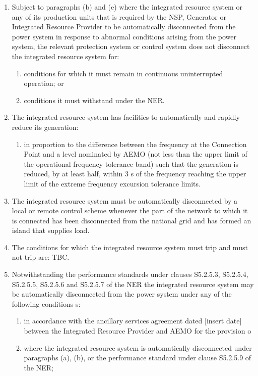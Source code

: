 \begin{enumerate}[label=(\alph*)]
	\item Subject to paragraphs (b) and (e) where the integrated resource system or any of its production units that is required by the NSP, Generator or Integrated Resource Provider to be automatically disconnected from the power system in response to abnormal conditions arising from the power system, the relevant protection system or control system does not disconnect the integrated resource system  for:
	\begin{enumerate}[label=(\roman*)]
		\item conditions for which it must remain in continuous uninterrupted operation; or
		\item conditions it must withstand under the NER.
	\end{enumerate}
	\item The integrated resource system has facilities to automatically and rapidly reduce its generation:
	\begin{enumerate}[label=(\roman*)]
		\item in proportion to the difference between the frequency at the Connection Point and a level nominated by AEMO (not less than the upper limit of the operational frequency tolerance band) such that the generation is reduced, by at least half, within 3 s of the frequency reaching the upper limit of the extreme frequency excursion tolerance limits.
	\end{enumerate}
	\item The integrated resource system must be automatically disconnected by a local or remote control scheme whenever the part of the network to which it is connected has been disconnected from the national grid and has formed an island that supplies load.
	\item The conditions for which the integrated resource system must trip and must not trip are: TBC.
	\item Notwithstanding the performance standards under clauses S5.2.5.3, S5.2.5.4, S5.2.5.5, S5.2.5.6 and S5.2.5.7 of the NER the integrated resource system may be automatically disconnected from the power system under any of the following conditions s:
	\begin{enumerate}[label=(\arabic*)]
		\item in accordance with the ancillary services agreement dated [insert date] between the Integrated Resource Provider and AEMO for the provision o
		\item where the integrated resource system is automatically disconnected under paragraphs (a), (b), or the performance standard under clause S5.2.5.9 of the NER;

\end{enumerate}
\end{enumerate}
